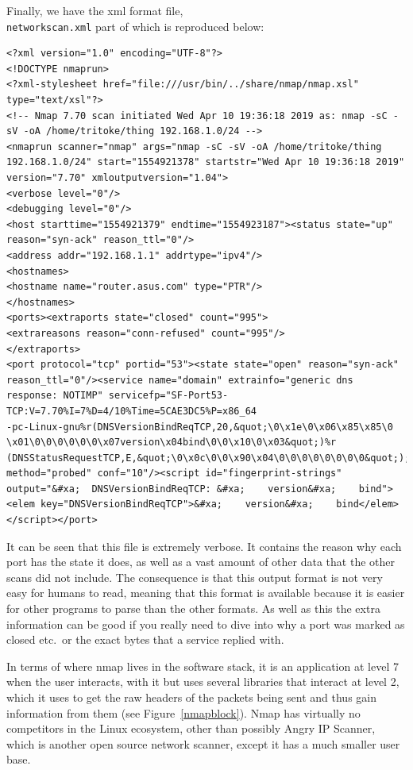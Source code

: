\documentclass[titlepage]{article}
\begin{document}
Finally, we have the \gls{xml} format file, \\
\verb|networkscan.xml| part of which is reproduced below:
\lstset{language=xml}
\begin{lstlisting}
<?xml version="1.0" encoding="UTF-8"?>
<!DOCTYPE nmaprun>
<?xml-stylesheet href="file:///usr/bin/../share/nmap/nmap.xsl" type="text/xsl"?>
<!-- Nmap 7.70 scan initiated Wed Apr 10 19:36:18 2019 as: nmap -sC -sV -oA /home/tritoke/thing 192.168.1.0/24 -->
<nmaprun scanner="nmap" args="nmap -sC -sV -oA /home/tritoke/thing 192.168.1.0/24" start="1554921378" startstr="Wed Apr 10 19:36:18 2019" version="7.70" xmloutputversion="1.04">
<verbose level="0"/>
<debugging level="0"/>
<host starttime="1554921379" endtime="1554923187"><status state="up" reason="syn-ack" reason_ttl="0"/>
<address addr="192.168.1.1" addrtype="ipv4"/>
<hostnames>
<hostname name="router.asus.com" type="PTR"/>
</hostnames>
<ports><extraports state="closed" count="995">
<extrareasons reason="conn-refused" count="995"/>
</extraports>
<port protocol="tcp" portid="53"><state state="open" reason="syn-ack" reason_ttl="0"/><service name="domain" extrainfo="generic dns response: NOTIMP" servicefp="SF-Port53-TCP:V=7.70%I=7%D=4/10%Time=5CAE3DC5%P=x86_64
-pc-Linux-gnu%r(DNSVersionBindReqTCP,20,&quot;\0\x1e\0\x06\x85\x85\0
\x01\0\0\0\0\0\0\x07version\x04bind\0\0\x10\0\x03&quot;)%r
(DNSStatusRequestTCP,E,&quot;\0\x0c\0\0\x90\x04\0\0\0\0\0\0\0\0&quot;);" method="probed" conf="10"/><script id="fingerprint-strings" output="&#xa;  DNSVersionBindReqTCP: &#xa;    version&#xa;    bind"><elem key="DNSVersionBindReqTCP">&#xa;    version&#xa;    bind</elem>
</script></port>
\end{lstlisting}
It can be seen that this file is extremely verbose.
It contains the reason why each port has the state it does, as well as a
vast amount of other data that the other scans did not include. 
The consequence is that this output format is not very easy for humans to read,
meaning that this format is available because it is easier for other programs
to parse than the other formats. As well as this the extra information can be good
if you really need to dive into why a port was marked as closed etc.\
or the exact bytes that a service replied with.

In terms of where nmap lives in the software stack, it is an application at level 7 when the
user interacts, with it but uses several libraries that interact at level 2, which it uses to get
the raw headers of the packets being sent and thus gain information from them (see Figure~\ref{nmapblock}).
Nmap has virtually no competitors in the Linux ecosystem,
other than possibly Angry IP Scanner,
which is another open source network scanner,
except it has a much smaller user base. \\
\end{document}
